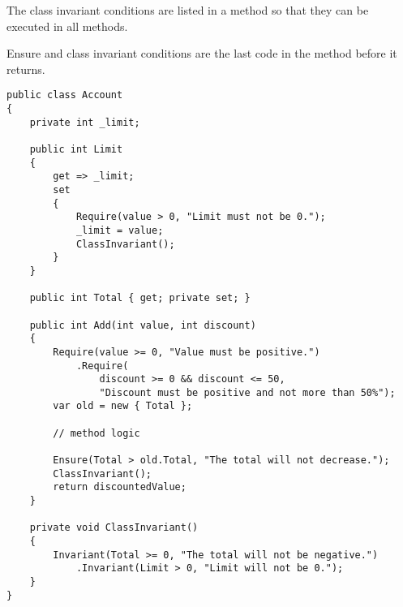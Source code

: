 The class invariant conditions are listed in a method so that they can be executed
in all methods. 

Ensure and class invariant conditions are the last code in the method before it 
returns. 

\begin{lstlisting}[frame=single]
public class Account
{
    private int _limit;

    public int Limit
    {
        get => _limit;
        set
        {
            Require(value > 0, "Limit must not be 0.");
            _limit = value;
            ClassInvariant();
        }
    }

    public int Total { get; private set; }

    public int Add(int value, int discount)
    {
        Require(value >= 0, "Value must be positive.")
            .Require(
                discount >= 0 && discount <= 50, 
                "Discount must be positive and not more than 50%");
        var old = new { Total };

        // method logic

        Ensure(Total > old.Total, "The total will not decrease.");
        ClassInvariant();
        return discountedValue;
    }
    
    private void ClassInvariant()
    {
        Invariant(Total >= 0, "The total will not be negative.")
            .Invariant(Limit > 0, "Limit will not be 0.");
    }
}
\end{lstlisting}